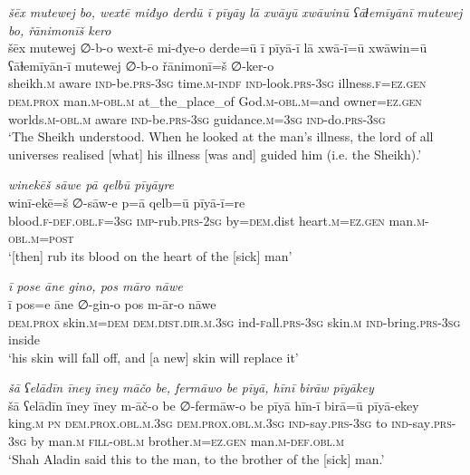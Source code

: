 \ea \label{DG.46}
\textit{šēx mutewej bo, wextē miđyo derdū ī pīyāy lā xwāyū xwāwinū ʕāɫemīyānī mutewej bo, řānimonīš kero} \\ 
\gll šēx mutewej ∅-b-o wext-ē mi-đye-o derde=ū ī pīyā-ī lā xwā-ī=ū xwāwin=ū ʕāɫemīyān-ī mutewej ∅-b-o řānimonī=š ∅-ker-o \\ 
 sheikh\textsc{.m} aware \textsc{ind-}be\textsc{.prs}\textsc{-3sg} time\textsc{.m}\textsc{-indf} \textsc{ind-}look\textsc{.prs}\textsc{-3sg} illness\textsc{\textsc{.f}}\textsc{=ez}\textsc{.gen} \textsc{dem.prox} man\textsc{.m}\textsc{-obl}\textsc{.m} at\_the\_place\_of God\textsc{.m}\textsc{-obl}\textsc{.m}=and owner\textsc{=ez}\textsc{.gen} worlds\textsc{.m}\textsc{-obl}\textsc{.m} aware \textsc{ind-}be\textsc{.prs}\textsc{-3sg} guidance\textsc{.m}\textsc{=3sg} \textsc{ind-}do\textsc{.prs}\textsc{-3sg} \\ 
\glt `The Sheikh understood. When he looked at the man’s illness, the lord of all universes realised [what] his illness [was and] guided him (i.e. the Sheikh).'
\z 
 
\ea \label{DG.50}
\textit{winekēš sāwe pā qelbū pīyāyre} \\ 
\gll winī-ekē=š ∅-sāw-e p=ā qelb=ū pīyā-ī=re \\ 
 blood\textsc{\textsc{.f}}\textsc{-def}\textsc{.obl}\textsc{\textsc{.f}}\textsc{=3sg} \textsc{imp-}rub\textsc{.prs}-\textsc{2sg} by\textsc{=dem}.dist heart\textsc{.m}\textsc{=ez}\textsc{.gen} man\textsc{.m}\textsc{-obl}\textsc{.m}\textsc{=\textsc{post}} \\ 
\glt `[then] rub its blood on the heart of the [sick] man'
\z 
 
\ea \label{DG.51}
\textit{ī pose āne gino, pos māro nāwe} \\ 
\gll ī pos=e āne ∅-gin-o pos m-ār-o nāwe \\ 
 \textsc{dem.prox} skin\textsc{.m}\textsc{=dem} \textsc{dem.dist}\textsc{.dir}\textsc{.m}\textsc{.3sg} ind\textsc{-f}all\textsc{.prs}\textsc{-3sg} skin\textsc{.m} \textsc{ind-}bring\textsc{.prs}\textsc{-3sg} inside \\ 
\glt `his skin will fall off, and [a new] skin will replace it'
\z 
 
\ea \label{DG.53}
\textit{šā ʕelādīn īney īney māčo be, fermāwo be pīyā, hīnī birāw pīyākey} \\ 
\gll šā ʕelādīn īney īney m-āč-o be ∅-fermāw-o be pīyā hīn-ī birā=ū pīyā-ekey \\ 
 king\textsc{.m} \textsc{pn} \textsc{dem.prox}\textsc{.obl}\textsc{.m}\textsc{.3sg} \textsc{dem.prox}\textsc{.obl}\textsc{.m}\textsc{.3sg} \textsc{ind-}say\textsc{.prs}\textsc{-3sg} to \textsc{ind-}say\textsc{.prs}\textsc{-3sg} by man\textsc{.m} \textsc{fill}\textsc{-obl}\textsc{.m} brother\textsc{.m}\textsc{=ez}\textsc{.gen} man\textsc{.m}\textsc{-def}\textsc{.obl}\textsc{.m} \\ 
\glt `Shah Aladin said this to the man, to the brother of the [sick] man.'
\z 
 

